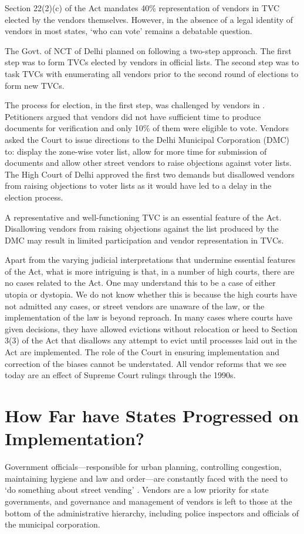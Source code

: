 \documentclass[a4paper, 12pt, twoside, table]{article}
\begin{document}
{Section 22(2)(c) of the Act mandates 40\% representation of vendors in TVC elected by the vendors themselves. However, in the absence of a legal identity of vendors in most states, `who can vote' remains a debatable question.
 
The Govt. of NCT of Delhi planned on following a two-step approach. The first step was to form TVCs elected by vendors in official lists. The second step was to task TVCs with enumerating all vendors prior to the second round of elections to form new TVCs. 

The process for election, in the first step, was challenged by vendors in \cite{RPKHU}. Petitioners argued that vendors did not have sufficient time to produce documents for verification and only 10\% of them were eligible to vote. Vendors asked the Court to issue directions to the Delhi Municipal Corporation (DMC) to: display the zone-wise voter list, allow for more time for submission of documents and allow other street vendors to raise objections against voter lists. The High Court of Delhi approved the first two demands but disallowed vendors from raising objections to voter lists as it would have led to a delay in the election process. 

A representative and well-functioning TVC is an essential feature of the Act. Disallowing vendors from raising objections against the list produced by the DMC may result in limited participation and vendor representation in TVCs. 

Apart from the varying judicial interpretations that undermine essential features of the Act, what is more intriguing is that, in a number of high courts, there are no cases related to the Act. One may understand this to be a case of either utopia or dystopia. We do not know whether this is because the high courts have not admitted any cases, or street vendors are unaware of the law, or the implementation of the law is beyond reproach. In many cases where courts have given decisions, they have allowed evictions without relocation or heed to Section 3(3) of the Act that disallows any attempt to evict until processes laid out in the Act are implemented. The role of the Court in ensuring implementation and correction of the biases cannot be understated. All vendor reforms that we see today are an effect of Supreme Court rulings through the 1990s. 

\section*{How Far have States Progressed on Implementation?}
	Government officials—responsible for urban planning, controlling congestion, maintaining hygiene and law and order—are constantly faced with the need to `do something about street vending' \parencite{bromleypaper}. Vendors are a low priority for state governments, and governance and management of vendors is left to those at the bottom of the administrative hierarchy, including police inspectors and officials of the municipal corporation.

}
\end{document}
